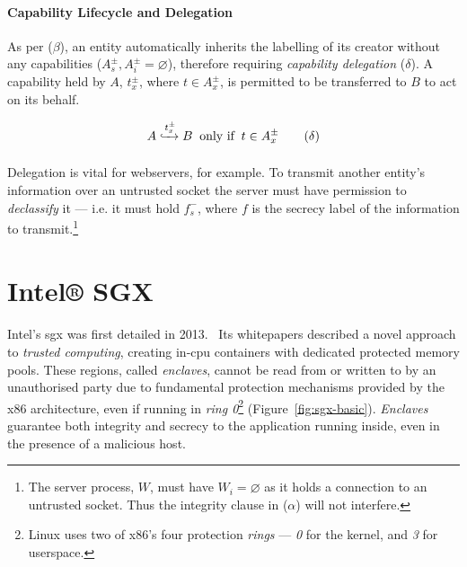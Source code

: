 \paragraph{Capability Lifecycle and Delegation} As per ($\beta$), an entity automatically inherits the labelling of its creator without any capabilities ($A_{s}^{\pm}, A_{i}^{\pm} = \varnothing$), therefore requiring \textit{capability delegation} ($\delta$). A capability held by $A$, $t_{x}^{\pm}$, where $t \in A_{x}^{\pm}$, is permitted to be transferred to $B$ to act on its behalf.

\vspace{-3mm}
\begin{equation}
    A \xhookrightarrow[]{t^{\pm}_{x}} B \;\; \text{only if} \;\; t \in A_{x}^{\pm} \tag{$\delta$}
\end{equation}

\paragraph{} Delegation is vital for webservers, for example. To transmit another entity's information over an untrusted socket the server must have permission to \textit{declassify} it --- i.e. it must hold $f_{s}^{-}$, where $f$ is the secrecy label of the information to transmit.\footnote{The server process, $W$, must have $W_{i} = \varnothing$ as it holds a connection to an untrusted socket. Thus the integrity clause in ($\alpha$) will not interfere.}


\clearpage
\section{Intel® SGX}

\paragraph{} Intel's \acrfull{sgx} was first detailed in 2013.~\cite{10.1145/2487726.2488370, 10.1145/2487726.2488368, Anati2013InnovativeTF, sgx-sgx-reference} Its whitepapers described a novel approach to \textit{trusted computing}, creating in-\acrshort{cpu} containers with dedicated protected memory pools. These regions, called \textit{enclaves}, cannot be read from or written to by an unauthorised party due to fundamental protection mechanisms provided by the x86 architecture, even if running in \textit{ring 0}\footnote{Linux uses two of x86's four protection \textit{rings} --- \textit{0} for the kernel, and \textit{3} for userspace.} (Figure~\ref{fig:sgx-basic}). \textit{Enclaves} guarantee both integrity and secrecy to the application running inside, even in the presence of a malicious host.

